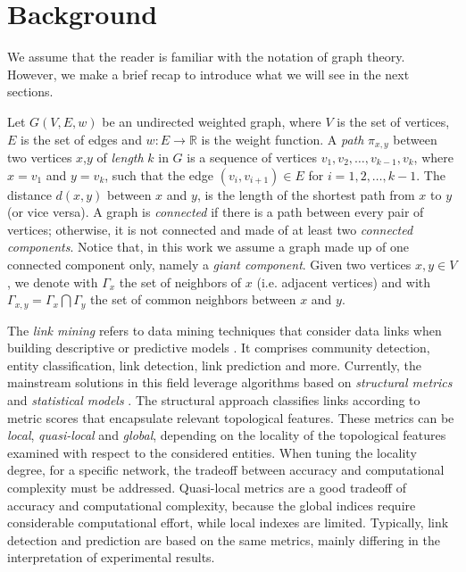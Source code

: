\section{Background}
\label{sec:background}
We assume that the reader is familiar with the notation of graph theory. 
However, we make a brief recap to introduce what we will see in the next sections.

Let $G(V,E,w)$ be an undirected weighted graph, where $V$ is the set of vertices, $E$ is the set of edges and $w:E\rightarrow\mathbb{R}$ is the weight function. 
A \textit{path} $\pi_{x,y}$ between two vertices $x$,$y$ of \textit{length} $k$ in $G$ is a sequence of vertices $v_{1},v_{2},\ldots,v_{k-1},v_{k}$, where $x = v_{1}$ and $y = v_{k}$, such that the edge $(v_{i},v_{i+1}) \in E$ for $i = 1, 2,\ldots,k-1$. 
The distance $d(x,y)$ between $x$ and $y$, is the length of the shortest path from $x$ to $y$ (or vice versa).
A graph is \textit{connected} if there is a path between every pair of vertices; otherwise, it is not connected and made of at least two \textit{connected components}.
Notice that, in this work we assume a graph made up of one connected component only, namely a \textit{giant component}.
Given two vertices $x,y \in V$, we denote with $\Gamma_{x}$ the set of neighbors of $x$ (i.e. adjacent vertices) and with $\Gamma_{x,y} = \Gamma_{x} \bigcap \Gamma_{y}$ the set of common neighbors between $x$ and $y$.

The \textit{link mining} refers to data mining techniques that consider data links when building descriptive or predictive models \cite{getoor2005link}. It comprises community detection, entity classification, link detection, link prediction and more. 
Currently, the mainstream solutions in this field leverage algorithms based on \textit{structural metrics} and \textit{statistical models} \cite{berlusconi2016link,Liben-Nowell,Lu2011}.
The structural approach classifies links according to metric scores that encapsulate relevant topological features. 
These metrics can be \textit{local}, \textit{quasi-local} and \textit{global}, depending on the locality of the topological features examined with respect to the considered entities. 
When tuning the locality degree, for a specific network, the  tradeoff between accuracy and computational complexity must be addressed.
Quasi-local metrics are a good tradeoff of accuracy and computational complexity, because the global indices require considerable computational effort, while local indexes are limited. 
Typically, link detection and prediction are based on the same metrics, mainly differing in the interpretation of experimental results.

